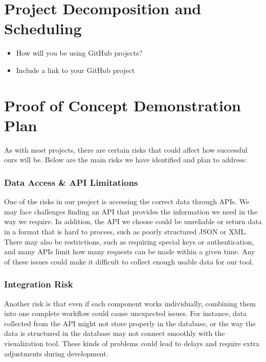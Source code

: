 \documentclass{article}
\begin{document}
\section{Project Decomposition and Scheduling}

\begin{itemize}
  \item How will you be using GitHub projects?
  \item Include a link to your GitHub project
\end{itemize}


\section{Proof of Concept Demonstration Plan}


As with most projects, there are certain risks that could affect how successful ours will be. Below are the main risks we have identified and plan to address:

\subsubsection*{Data Access \& API Limitations}\vspace{-0.5em}
One of the risks in our project is accessing the correct data through APIs. We may face challenges finding an API that provides the information we need in the way we require. In addition, the API we choose could be unreliable or return data in a format that is hard to process, such as poorly structured JSON or XML. There may also be restrictions, such as requiring special keys or authentication, and many APIs limit how many requests can be made within a given time. Any of these issues could make it difficult to collect enough usable data for our tool.
\subsubsection*{Integration Risk}\vspace{-0.5em}
Another risk is that even if each component works individually, combining them into one complete workflow could cause unexpected issues. For instance, data collected from the API might not store properly in the database, or the way the data is structured in the database may not connect smoothly with the visualization tool. These kinds of problems could lead to delays and require extra adjustments during development.
\end{document}
